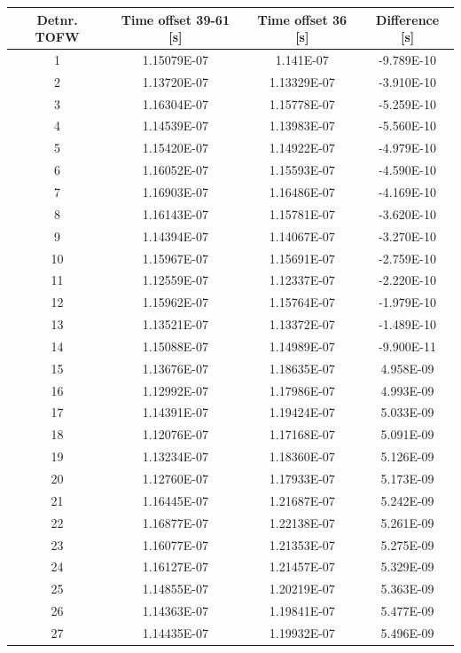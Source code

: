 \documentclass[12pt, letterpaper]{article}
\begin{document}
\begin{tabular}{|c|c|c|c|}
\hline
Detnr. TOFW & Time offset 39-61 [s] & Time offset 36 [s] & Difference [s] \\
\hline
1      &	1.15079E-07 &	1.141E-07    &  -9.789E-10\\
2	   &	1.13720E-07	&	1.13329E-07  &  -3.910E-10\\
3	   &	1.16304E-07	&	1.15778E-07  &  -5.259E-10\\
4 	   &	1.14539E-07	&	1.13983E-07  &  -5.560E-10\\
5	   &	1.15420E-07	&	1.14922E-07  &  -4.979E-10\\
6	   &	1.16052E-07	&	1.15593E-07  &  -4.590E-10\\
7	   &	1.16903E-07	&   1.16486E-07  &  -4.169E-10\\
8	   &	1.16143E-07	&   1.15781E-07  &  -3.620E-10\\
9	   &	1.14394E-07	&   1.14067E-07  &  -3.270E-10\\
10	   &	1.15967E-07	&   1.15691E-07  &  -2.759E-10\\
11     & 	1.12559E-07	&   1.12337E-07  &  -2.220E-10\\
12     &	1.15962E-07	&   1.15764E-07  &  -1.979E-10\\
13     &	1.13521E-07	&   1.13372E-07  &  -1.489E-10\\
14     &	1.15088E-07	&   1.14989E-07  &  -9.900E-11\\
15	   &	1.13676E-07	&   1.18635E-07  &  4.958E-09\\
16	   &	1.12992E-07	&   1.17986E-07  &  4.993E-09\\
17	   &	1.14391E-07	&   1.19424E-07  &  5.033E-09\\
18	   &	1.12076E-07	&   1.17168E-07  &  5.091E-09\\
19	   &	1.13234E-07	&   1.18360E-07  &  5.126E-09\\
20	   &	1.12760E-07	&   1.17933E-07  &  5.173E-09\\
21	   &	1.16445E-07	&   1.21687E-07  &  5.242E-09\\
22	   &	1.16877E-07	&   1.22138E-07  &  5.261E-09\\
23	   &	1.16077E-07	&   1.21353E-07  &  5.275E-09\\
24     &	1.16127E-07	&   1.21457E-07  &  5.329E-09\\
25	   &	1.14855E-07	&   1.20219E-07  &  5.363E-09\\
26	   &	1.14363E-07	&   1.19841E-07  &  5.477E-09\\
27	   &	1.14435E-07	&   1.19932E-07  &  5.496E-09\\


\hline

\end{tabular}
\newline
\end{document}

